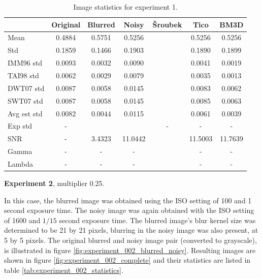 \documentclass[12pt,notitlepage]{report}
\begin{document}
\begin{table}[htb]
  \centering
  \begin{tabular}{ | l | c | c | c | c | c | c | }
    \hline
		& Original & Blurred & Noisy & Šroubek & Tico & BM3D \\ \hline
	Mean & 0.4884 & 0.5751 & 0.5256 &  & 0.5256 & 0.5256 \\ \hline
	Std & 0.1859 & 0.1466 & 0.1903 &  & 0.1890 & 0.1899 \\ \hline
	IMM96 std & 0.0093 & 0.0032 & 0.0090 &  & 0.0041 & 0.0019 \\ \hline
	TAI98 std  & 0.0062 & 0.0029 & 0.0079 &  & 0.0035 & 0.0013 \\ \hline
	DWT07 std  & 0.0087 & 0.0058 & 0.0145 &  & 0.0083 & 0.0062 \\ \hline
	SWT07 std & 0.0087 & 0.0058 & 0.0145 &  & 0.0085 & 0.0063 \\ \hline
	Avg est std & 0.0082 & 0.0044 & 0.0115 &  & 0.0061 & 0.0039 \\ \hline
	Exp std & - &  &  & - & - & - \\ \hline
	SNR     & - & 3.4323 & 11.0442 &  & 11.5003 & 11.7639 \\ \hline
	Gamma & - & - & - &  & - & - \\ \hline
	Lambda & - & - & - &  & - & - \\ \hline

  \end{tabular}
  \caption{Image statistics for experiment 1.}
  \label{tab:experiment_001_statistics}
\end{table}


\noindent \textbf{Experiment 2}, multiplier 0.25.

In this case, the blurred image was obtained using the ISO setting of 100 and 1 second exposure time. The noisy image was again obtained with the ISO setting of 1600 and $1/15$ second exposure time. The blurred image's blur kernel size was determined to be 21 by 21 pixels, blurring in the noisy image was also present, at 5 by 5 pixels. The original blurred and noisy image pair (converted to grayscale), is illustrated in figure \ref{fig:experiment_002_blurred_noisy}. Resulting images are shown in figure \ref{fig:experiment_002_complete} and their statistics are listed in table \ref{tab:experiment_002_statistics}.

\end{document}
